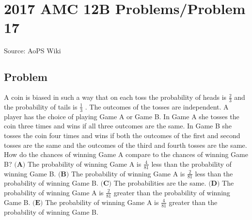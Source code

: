 \documentclass[12pt]{article}
\begin{document}
\section*{{2017 AMC 12B Problems/Problem 17}}
Source: AoPS Wiki

\subsection*{Problem}
A coin is biased in such a way that on each toss the probability of heads is $\frac{2}{3}$ and the probability of tails is $\frac{1}{3}$ . The outcomes of the tosses are independent. A player has the choice of playing Game A or Game B. In Game A she tosses the coin three times and wins if all three outcomes are the same. In Game B she tosses the coin four times and wins if both the outcomes of the first and second tosses are the same and the outcomes of the third and fourth tosses are the same. How do the chances of winning Game A compare to the chances of winning Game B? $\textbf{(A)}$ The probability of winning Game A is $\frac{4}{81}$ less than the probability of winning Game B. $\textbf{(B)}$ The probability of winning Game A is $\frac{2}{81}$ less than the probability of winning Game B. $\textbf{(C)}$ The probabilities are the same. $\textbf{(D)}$ The probability of winning Game A is $\frac{2}{81}$ greater than the probability of winning Game B. $\textbf{(E)}$ The probability of winning Game A is $\frac{4}{81}$ greater than the probability of winning Game B.
\end{document}
